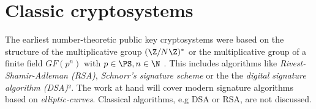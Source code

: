 \section{Classic cryptosystems}

The earliest number-theoretic public
key cryptosystems were based on the structure of the multiplicative
group $(\Z/N\Z)^*$ or the multiplicative group of a finite field $GF(p^n)$ with $p \in \PS, n \in \N$
\cite{bruce867}. This includes algorithms like \emph{Rivest-Shamir-Adleman (RSA)},
\emph{Schnorr's signature scheme} or the the \emph{digital signature algorithm (DSA)}².
The work at hand will cover modern signature algorithms based on \emph{elliptic-curves}.
Classical algorithms, e.g DSA or RSA, are not discussed.